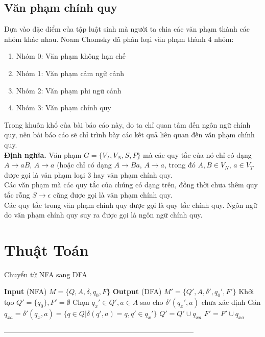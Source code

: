 \documentclass[14pt]{extreport}
\begin{document}
\subsection{Văn phạm chính quy}
Dựa vào đặc điểm của tập luật sinh mà người ta chia các văn phạm thành các nhóm khác nhau. Noam Chomsky đã phân loại văn phạm thành 4 nhóm:
\begin{enumerate}
\item Nhóm 0: Văn phạm không hạn chế
\item Nhóm 1: Văn phạm cảm ngữ cảnh
\item Nhóm 2: Văn phạm phi ngữ cảnh
\item Nhóm 3: Văn phạm chính quy
\end{enumerate}

Trong khuôn khổ của bài báo cáo này, do ta chỉ quan tâm đến ngôn ngữ chính quy, nên bài báo cáo sẽ chỉ trình bày các kết quả liên quan đến văn phạm  chính quy.\\
\textbf{Định nghĩa.} Văn phạm $G = \{ V_T, V_N, S, P \}$ mà các quy tắc của nó chỉ có dạng $A \rightarrow aB$, $A \rightarrow a$ (hoặc chỉ có dạng $A \rightarrow Ba$, $A \rightarrow a$, trong đó $A, B \in V_N$, $a \in V_T$ được gọi là văn phạm loại 3 hay văn phạm chính quy.\\
Các văn phạm mà các quy tắc của chúng có dạng trên, đồng thời chưa thêm quy tắc rỗng $S \rightarrow \epsilon$ cũng được gọi là văn phạm chính quy.\\
Các quy tắc trong văn phạm chính quy được gọi là quy tắc chính quy. Ngôn ngữ do văn phạm chính quy suy ra được gọi là ngôn ngữ chính quy.

\section{Thuật Toán}
\begin{algorithm}[H]
\caption{Chuyển từ NFA sang DFA}
\begin{algorithmic} 
\STATE \textbf{Input} (NFA) $M = \{Q, A, \delta, q_0, F\}$
\STATE \textbf{Output} (DFA) $M' = \{Q', A, \delta', q_0', F'\}$
\STATE Khởi tạo $Q' = \{q_0\}, F' = \emptyset$
\STATE Chọn $q_x' \in Q', a \in A$ sao cho $\delta'(q_x', a)$ chưa xác định
\STATE Gán $q_{xa} = \delta'(q_x, a) = \{q \in Q | \delta(q', a) = q, q' \in q_x'\}$
\STATE $Q' = Q' \cup q_{xa}$
\ENDIF
{}
\STATE $F' = F' \cup q_{xa}$
\ENDIF
\ENDWHILE
\end{algorithmic}
\end{algorithm}
--------------------------------------------------------------------------------\\
\end{document}
